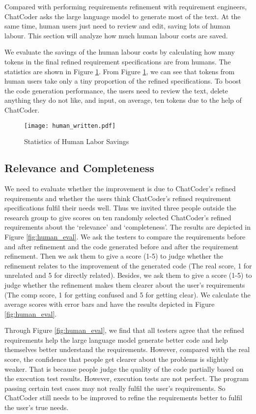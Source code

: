 \documentclass[sigconf]{acmart}
\begin{document}
Compared with performing requirements refinement with requirement engineers, ChatCoder asks the large language model to generate most of the text. At the same time, human users just need to review and edit, saving lots of human labour. This section will analyze how much human labour costs are saved.

We evaluate the savings of the human labour costs by calculating how many tokens in the final refined requirement specifications are from humans. The statistics are shown in Figure \ref{fig:labor_savings}. From Figure \ref{fig:labor_savings}, we can see that tokens from human users take only a tiny proportion of the refined specifications. To boost the code generation performance, the users need to review the text, delete anything they do not like, and input, on average, ten tokens due to the help of ChatCoder.

\begin{figure}[htbp]
    \centering
    \texttt{[image: human\_written.pdf]}
    \caption{Statistics of Human Labor Savings}
    \label{fig:labor_savings}
\end{figure}


\subsection{Relevance and Completeness}

We need to evaluate whether the improvement is due to ChatCoder's refined requirements and whether the users think ChatCoder's refined requirement specifications fulfil their needs well. Thus we invited three people outside the research group to give scores on ten randomly selected ChatCoder's refined requirements about the `relevance' and `completeness'. The results are depicted in Figure \ref{fig:human_eval}. We ask the testers to compare the requirements before and after refinement and the code generated before and after the requirement refinement. Then we ask them to give a score (1-5) to judge whether the refinement relates to the improvement of the generated code (The real score, 1 for unrelated and 5 for directly related). Besides, we ask them to give a score (1-5) to judge whether the refinement makes them clearer about the user's requirements (The comp score, 1 for getting confused and 5 for getting clear). We calculate the average scores with error bars and have the results depicted in Figure \ref{fig:human_eval}.

Through Figure \ref{fig:human_eval}, we find that all testers agree that the refined requirements help the large language model generate better code and help themselves better understand the requirements. However, compared with the real score, the confidence that people get clearer about the problems is slightly weaker. That is because people judge the quality of the code partially based on the execution test results. However, execution tests are not perfect. The program passing certain test cases may not really fulfil the user's requirements. So ChatCoder still needs to be improved to refine the requirements better to fulfil the user's true needs.
\end{document}
